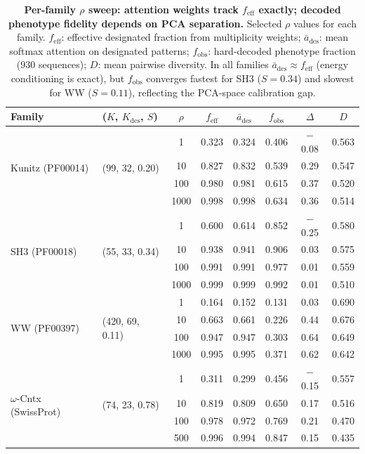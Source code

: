 \documentclass[journal=jcisd8,manuscript=article]{achemso}
\theoremstyle{definition}
\theoremstyle{remark}
\begin{document}
\begin{table}[p]
  \centering
  \caption{\textbf{Per-family $\rho$ sweep: attention weights track
  $f_{\mathrm{eff}}$ exactly; decoded phenotype fidelity depends on PCA
  separation.} Selected $\rho$ values for each family.
  $f_{\mathrm{eff}}$: effective designated fraction from multiplicity weights;
  $\bar{a}_{\mathrm{des}}$: mean softmax attention on designated patterns;
  $f_{\mathrm{obs}}$: hard-decoded phenotype fraction (930 sequences);
  $D$: mean pairwise diversity.
  In all families $\bar{a}_{\mathrm{des}} \approx f_{\mathrm{eff}}$
  (energy conditioning is exact), but $f_{\mathrm{obs}}$ converges fastest
  for SH3 ($S=0.34$) and slowest for WW ($S=0.11$), reflecting the
  PCA-space calibration gap.}
  \label{tab:per-family-rho}
  \small
  \begin{tabular}{llcccccc}
    \toprule
    Family & ($K$, $K_{\mathrm{des}}$, $S$)
      & $\rho$ & $f_{\mathrm{eff}}$ & $\bar{a}_{\mathrm{des}}$
      & $f_{\mathrm{obs}}$ & $\Delta$ & $D$ \\
    \midrule
    \multirow{4}{*}{Kunitz (PF00014)}
      & \multirow{4}{*}{(99, 32, 0.20)}
      &    1 & 0.323 & 0.324 & 0.406 & $-$0.08 & 0.563 \\
    & &   10 & 0.827 & 0.832 & 0.539 & 0.29 & 0.547 \\
    & &  100 & 0.980 & 0.981 & 0.615 & 0.37 & 0.520 \\
    & & 1000 & 0.998 & 0.998 & 0.634 & 0.36 & 0.514 \\
    \midrule
    \multirow{4}{*}{SH3 (PF00018)}
      & \multirow{4}{*}{(55, 33, 0.34)}
      &    1 & 0.600 & 0.614 & 0.852 & $-$0.25 & 0.580 \\
    & &   10 & 0.938 & 0.941 & 0.906 & 0.03 & 0.575 \\
    & &  100 & 0.991 & 0.991 & 0.977 & 0.01 & 0.559 \\
    & & 1000 & 0.999 & 0.999 & 0.992 & 0.01 & 0.510 \\
    \midrule
    \multirow{4}{*}{WW (PF00397)}
      & \multirow{4}{*}{(420, 69, 0.11)}
      &    1 & 0.164 & 0.152 & 0.131 & 0.03 & 0.690 \\
    & &   10 & 0.663 & 0.661 & 0.226 & 0.44 & 0.676 \\
    & &  100 & 0.947 & 0.947 & 0.303 & 0.64 & 0.649 \\
    & & 1000 & 0.995 & 0.995 & 0.371 & 0.62 & 0.642 \\
    \midrule
    \multirow{4}{*}{$\omega$-Cntx (SwissProt)}
      & \multirow{4}{*}{(74, 23, 0.78)}
      &    1 & 0.311 & 0.299 & 0.456 & $-$0.15 & 0.557 \\
    & &   10 & 0.819 & 0.809 & 0.650 & 0.17 & 0.516 \\
    & &  100 & 0.978 & 0.972 & 0.769 & 0.21 & 0.470 \\
    & &  500 & 0.996 & 0.994 & 0.847 & 0.15 & 0.435 \\
    \bottomrule
  \end{tabular}
\end{table}
\end{document}
